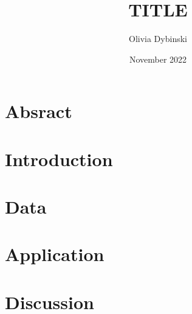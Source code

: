\documentclass[12pt]{article}
\title{TITLE}
\author{Olivia Dybinski\\}
\date{November 2022}
\begin{document}
 \maketitle


 \section{Absract} 
 \label{sec:abstract}


 \section{Introduction} 
 \label{sec:intro}


 \section{Data} 
 \label{sec:data}


 \section{Application} 
 \label{sec:app}


 \section{Discussion} 
 \label{sec:disc}




 
 {}
\end{document}
